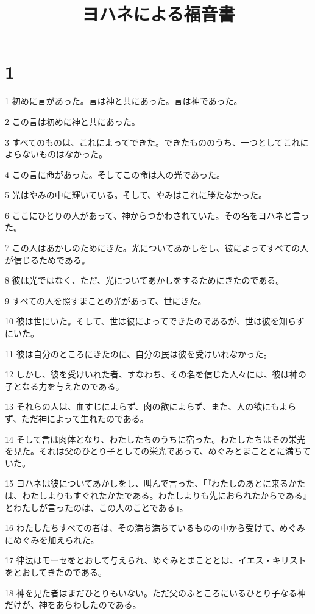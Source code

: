 

\title{ヨハネによる福音書}


\chapter{1}

\par 1 初めに言があった。言は神と共にあった。言は神であった。
\par 2 この言は初めに神と共にあった。
\par 3 すべてのものは、これによってできた。できたもののうち、一つとしてこれによらないものはなかった。
\par 4 この言に命があった。そしてこの命は人の光であった。
\par 5 光はやみの中に輝いている。そして、やみはこれに勝たなかった。
\par 6 ここにひとりの人があって、神からつかわされていた。その名をヨハネと言った。
\par 7 この人はあかしのためにきた。光についてあかしをし、彼によってすべての人が信じるためである。
\par 8 彼は光ではなく、ただ、光についてあかしをするためにきたのである。
\par 9 すべての人を照すまことの光があって、世にきた。
\par 10 彼は世にいた。そして、世は彼によってできたのであるが、世は彼を知らずにいた。
\par 11 彼は自分のところにきたのに、自分の民は彼を受けいれなかった。
\par 12 しかし、彼を受けいれた者、すなわち、その名を信じた人々には、彼は神の子となる力を与えたのである。
\par 13 それらの人は、血すじによらず、肉の欲によらず、また、人の欲にもよらず、ただ神によって生れたのである。
\par 14 そして言は肉体となり、わたしたちのうちに宿った。わたしたちはその栄光を見た。それは父のひとり子としての栄光であって、めぐみとまこととに満ちていた。
\par 15 ヨハネは彼についてあかしをし、叫んで言った、「『わたしのあとに来るかたは、わたしよりもすぐれたかたである。わたしよりも先におられたからである』とわたしが言ったのは、この人のことである」。
\par 16 わたしたちすべての者は、その満ち満ちているものの中から受けて、めぐみにめぐみを加えられた。
\par 17 律法はモーセをとおして与えられ、めぐみとまこととは、イエス・キリストをとおしてきたのである。
\par 18 神を見た者はまだひとりもいない。ただ父のふところにいるひとり子なる神だけが、神をあらわしたのである。
